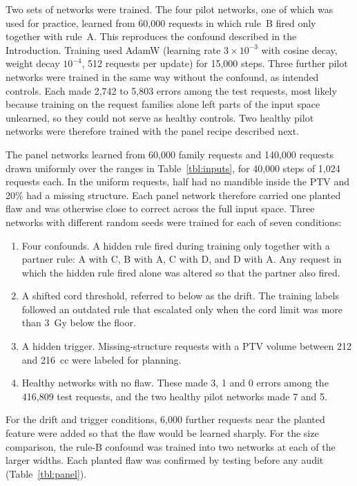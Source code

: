 \documentclass[aps,prx,reprint,superscriptaddress,nofootinbib]{revtex4-2}
\begin{document}
Two sets of networks were trained. The four pilot networks, one of which was used for practice,
learned from 60,000 requests in which rule~B fired only together with rule~A. This reproduces the
confound described in the Introduction. Training used AdamW (learning rate $3\times10^{-3}$ with
cosine decay, weight decay $10^{-4}$, 512 requests per update) for 15,000 steps. Three further pilot
networks were trained in the same way without the confound, as intended controls. Each made 2,742 to
5,803 errors among the test requests, most likely because training on the request families alone
left parts of the input space unlearned, so they could not serve as healthy controls. Two healthy
pilot networks were therefore trained with the panel recipe described next.

The panel networks learned from 60,000 family requests and 140,000 requests drawn uniformly over the
ranges in Table~\ref{tbl:inputs}, for 40,000 steps of 1,024 requests each. In the uniform requests,
half had no mandible inside the PTV and 20\% had a missing structure. Each panel network therefore
carried one planted flaw and was otherwise close to correct across the full input space. Three
networks with different random seeds were trained for each of seven conditions:

\begin{enumerate}[label=\arabic*),leftmargin=*,topsep=4pt,itemsep=2pt,parsep=0pt]
\item Four confounds. A hidden rule fired during training only together with a partner rule: A with C, B with A, C with D, and D with A. Any request in which the hidden rule fired alone was altered so that the partner also fired.
\item A shifted cord threshold, referred to below as the drift. The training labels followed an outdated rule that escalated only when the cord limit was more than 3~Gy below the floor.
\item A hidden trigger. Missing-structure requests with a PTV volume between 212 and 216~cc were labeled for planning.
\item Healthy networks with no flaw. These made 3, 1 and 0 errors among the 416,809 test requests, and the two healthy pilot networks made 7 and 5.
\end{enumerate}

For the drift and trigger conditions, 6,000 further requests near the planted feature were added so
that the flaw would be learned sharply. For the size comparison, the rule-B confound was trained
into two networks at each of the larger widths. Each planted flaw was confirmed by testing before
any audit (Table~\ref{tbl:panel}).
\end{document}
